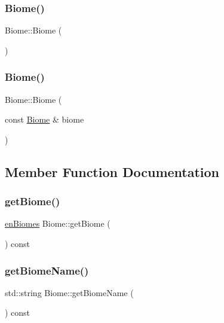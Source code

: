 \subsubsection{\texorpdfstring{Biome()}{Biome()}\hspace{0.1cm}{\footnotesize\ttfamily [1/2]}}
{\footnotesize\ttfamily Biome\+::\+Biome (\begin{DoxyParamCaption}{ }\end{DoxyParamCaption})}

\mbox{\label{class_biome_a6145de7d30bcbef4b6042ee456f88f16}} 
\subsubsection{\texorpdfstring{Biome()}{Biome()}\hspace{0.1cm}{\footnotesize\ttfamily [2/2]}}
{\footnotesize\ttfamily Biome\+::\+Biome (\begin{DoxyParamCaption}\item[{const \mbox{\hyperlink{class_biome}{Biome}} \&}]{biome }\end{DoxyParamCaption})}



\subsection{Member Function Documentation}
\mbox{\label{class_biome_a07d140ace0abea60f97735b509c41e66}} 
\subsubsection{\texorpdfstring{get\+Biome()}{getBiome()}}
{\footnotesize\ttfamily \mbox{\hyperlink{_enum_types_8hpp_a5c2255009cd01c90cf68245e6f453d1c}{en\+Biomes}} Biome\+::get\+Biome (\begin{DoxyParamCaption}{ }\end{DoxyParamCaption}) const}

\mbox{\label{class_biome_a5b7719cce19e74cfeb701e7fa4cdff4f}} 
\subsubsection{\texorpdfstring{get\+Biome\+Name()}{getBiomeName()}}
{\footnotesize\ttfamily std\+::string Biome\+::get\+Biome\+Name (\begin{DoxyParamCaption}{ }\end{DoxyParamCaption}) const}

